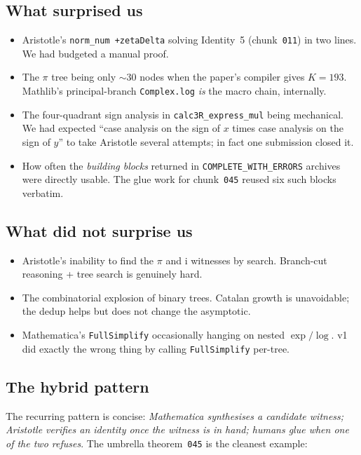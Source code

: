 \documentclass[11pt,a4paper]{article}
\theoremstyle{plain}
\theoremstyle{definition}
\newcommand{\imu}{\mathrm{i}}
\begin{document}
\subsection{What surprised us}

\begin{itemize}[leftmargin=*,nosep]
\item Aristotle's \texttt{norm\_num +zetaDelta} solving Identity~5
(chunk~\texttt{011}) in two lines.  We had budgeted a manual proof.
\item The $\pi$ tree being only $\sim$30 nodes when the paper's
compiler gives $K=193$.  Mathlib's principal-branch \texttt{Complex.log}
\emph{is} the macro chain, internally.
\item The four-quadrant sign analysis in \texttt{calc3R\_express\_mul}
being mechanical.  We had expected ``case analysis on the sign of $x$
times case analysis on the sign of $y$'' to take Aristotle several
attempts; in fact one submission closed it.
\item How often the \emph{building blocks} returned in
\texttt{COMPLETE\_WITH\_ERRORS} archives were directly usable.  The
glue work for chunk~\texttt{045} reused six such blocks verbatim.
\end{itemize}

\subsection{What did not surprise us}

\begin{itemize}[leftmargin=*,nosep]
\item Aristotle's inability to find the $\pi$ and $\imu$ witnesses by
search.  Branch-cut reasoning + tree search is genuinely hard.
\item The combinatorial explosion of binary trees.  Catalan growth is
unavoidable; the dedup helps but does not change the asymptotic.
\item Mathematica's \texttt{FullSimplify} occasionally hanging on
nested $\exp/\log$.  v1 did exactly the wrong thing by calling
\texttt{FullSimplify} per-tree.
\end{itemize}

\subsection{The hybrid pattern}

The recurring pattern is concise: \emph{Mathematica synthesises a
candidate witness; Aristotle verifies an identity once the witness is
in hand; humans glue when one of the two refuses}.  The umbrella
theorem~\texttt{045} is the cleanest example:
\end{document}
